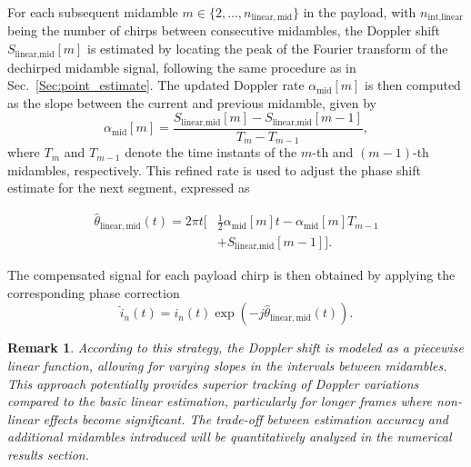 \documentclass{IEEEtran}
\newtheorem{remark}{Remark}
\begin{document}
For each subsequent midamble $m \in \{2, \dots, n_{\mathrm{linear,mid}}\}$ in the payload, with $n_\text{int,linear}$ being the number of chirps between consecutive midambles, the Doppler shift $S_{\text{linear,mid}}[m]$ is estimated by locating the peak of the Fourier transform of the dechirped midamble signal, following the same procedure as in Sec.~\ref{Sec:point_estimate}. The updated Doppler rate $\alpha_{\mathrm{mid}}[m]$ is then computed as the slope between the current and previous midamble, given by 
\begin{equation}
\alpha_{\mathrm{mid}}[m] = \frac{S_{\text{linear,mid}}[m] - S_{\text{linear,mid}}[m-1]}{T_m - T_{m-1}},
\end{equation}
where $T_m$ and $T_{m-1}$ denote the time instants of the $m$-th and $(m-1)$-th midambles, respectively. This refined rate is used to adjust the phase shift estimate for the next segment, expressed as

\begin{equation}
    \begin{split}
    \hat{\theta}_{\mathrm{linear,mid}}(t) = 2\pi t \bigg[ &\frac{1}{2}\alpha_{\text{mid}}[m] t -  \alpha_{\text{mid}}[m] T_{m-1} \\
    &+ S_{\text{linear,mid}}[m-1] \bigg].
    \end{split}
\end{equation}


The compensated signal for each payload chirp is then obtained by applying the corresponding phase correction
\begin{equation}  
\hat{i}_n(t) = i_n(t) \exp\left(-j \hat{\theta}_{\mathrm{linear,mid}}(t)\right).
\end{equation}

\begin{remark}
According to this strategy, the Doppler shift is modeled as a piecewise linear function, allowing for varying slopes in the intervals between midambles. This approach potentially provides superior tracking of Doppler variations compared to the basic linear estimation, particularly for longer frames where non-linear effects become significant. The trade-off between estimation accuracy and additional midambles introduced will be quantitatively analyzed in the numerical results section.
\end{remark}
\end{document}
